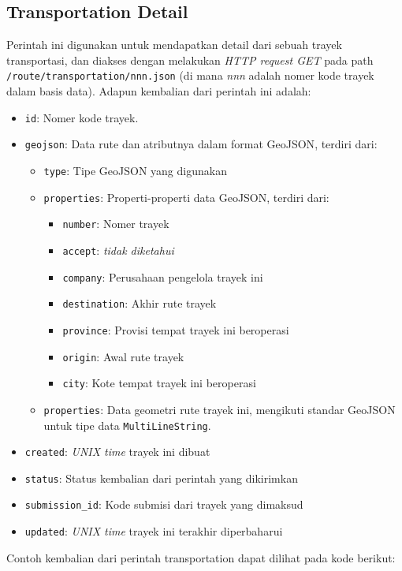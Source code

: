 \subsection{Transportation Detail}
Perintah ini digunakan untuk mendapatkan detail dari sebuah trayek transportasi,
dan diakses dengan melakukan \textit{HTTP request GET} pada path
\verb|/route/transportation/nnn.json| (di mana \textit{nnn} adalah nomer kode
trayek dalam basis data). Adapun kembalian dari perintah ini adalah:

\begin{itemize}
	\item \verb/id/: Nomer kode trayek.
	\item \verb/geojson/: Data rute dan atributnya dalam format
		GeoJSON\cite{geojson}, terdiri dari:
		\begin{itemize}
			\item \verb/type/: Tipe GeoJSON yang digunakan
			\item \verb/properties/: Properti-properti data GeoJSON, terdiri dari:
				\begin{itemize}
					\item \verb/number/: Nomer trayek
					\item \verb/accept/: \textit{tidak diketahui}
					\item \verb/company/: Perusahaan pengelola trayek ini
					\item \verb/destination/: Akhir rute trayek
					\item \verb/province/: Provisi tempat trayek ini beroperasi
					\item \verb/origin/: Awal rute trayek
					\item \verb/city/: Kote tempat trayek ini beroperasi
				\end{itemize}
			\item \verb/properties/: Data geometri rute trayek ini, mengikuti
				standar GeoJSON untuk tipe data \verb/MultiLineString/.
		\end{itemize}
	\item \verb/created/: \textit{UNIX time} trayek ini dibuat
	\item \verb/status/: Status kembalian dari perintah yang dikirimkan
	\item \verb/submission_id/: Kode submisi dari trayek yang dimaksud
	\item \verb/updated/: \textit{UNIX time} trayek ini terakhir diperbaharui
\end{itemize}

Contoh kembalian dari perintah transportation dapat dilihat pada kode berikut:

